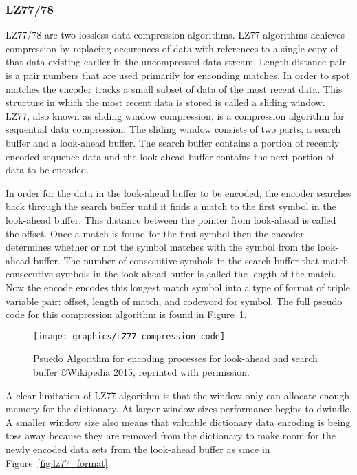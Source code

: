 \documentclass[letterpaper, 11pt]{article}
\begin{document}
\subsubsection{LZ77/78}
LZ77/78 are two lossless data compression algorithms. LZ77 algorithms achieves compression by replacing
occurences of data with references to a single copy of that data existing earlier in the uncompressed
data stream. Length-distance pair is a pair numbers that are used primarily for enconding matches. In order
to spot matches the encoder tracks a small subset of data of the most recent data. This structure in which
the most recent data is stored is called a sliding window. LZ77, also known as sliding window compression, is
a compression algorithm for sequential data compression. The sliding window consists of two parts, a search
buffer and a look-ahead buffer. The search buffer contains a portion of recently encoded sequence data and
the look-ahead buffer contains the next portion of data to be encoded.
\par\vspace{\baselineskip}

In order for the data in the look-ahead buffer to be encoded, the encoder searches back through the
search buffer until it finds a match to the first symbol in the look-ahead buffer. This distance between
the pointer from look-ahead is called the offset. Once a match is found for the first symbol then the encoder
determines whether or not the symbol matches with the symbol from the look-ahead buffer. The number of
consecutive symbols in the search buffer that match consecutive symbols in the look-ahead buffer is called
the length of the match. Now the encode encodes this longest match symbol into a type of format of triple
variable pair: offset, length of match, and codeword for symbol. The full pseudo code for this compression 
algorithm is found in Figure~\ref{fig:lz77_algo}.
\par\vspace{\baselineskip}

\begin{figure}
  \centering
  \texttt{[image: graphics/LZ77\_compression\_code]}
  \caption{Psuedo Algorithm for encoding processes for look-ahead and search buffer \copyright Wikipedia 2015, reprinted with permission.\cite{LZ77_78}}
  \label{fig:lz77_algo}
\end{figure}

\newpage

A clear limitation of LZ77 algorithm is that the window only can allocate enough memory for the dictionary. At
larger window sizes performance begins to dwindle. A smaller window size also means that valuable dictionary data
encoding is being toss away because they are removed from the dictionary to make room for the newly encoded data sets
from the look-ahead buffer as since in Figure~\ref{fig:lz77_format}.
\par\vspace{\baselineskip}
\end{document}
